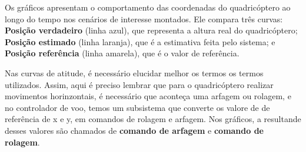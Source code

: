 Os gráficos apresentam o comportamento das coordenadas do quadricóptero ao longo do tempo nos cenários de interesse montados. Ele compara três curvas: \textbf{Posição verdadeiro} (linha azul), que representa a altura real do quadricóptero; \textbf{Posição estimado} (linha laranja), que é a estimativa feita pelo sistema; e \textbf{Posição referência} (linha amarela), que é o valor de referência.

Nas curvas de atitude, é necessário elucidar melhor os termos os termos utilizados. Assim, aqui é preciso lembrar que para o quadricóptero realizar movimentos horinzontais, é necessário que aconteça uma arfagem ou rolagem, e no controlador de voo, temos um subsistema que converte os valore de de referência de x e y, em comandos de rolagem e arfagem. Nos gráficos, a resultande desses valores são chamados de  \textbf{comando de arfagem} e \textbf{comando de rolagem}.


%
%
%

\printindex
